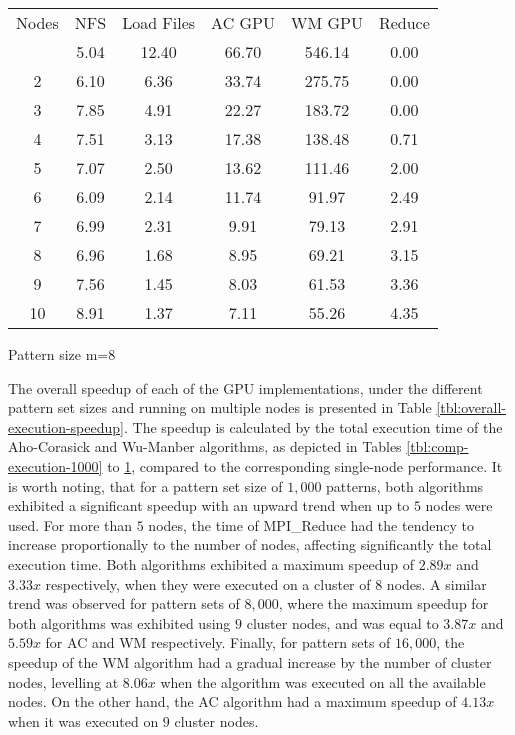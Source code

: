 \documentclass{ws-ijait}
\begin{document}
\begin{table}[h]
{\begin{tabular}{@{}c |ccccc@{}} \toprule
Nodes & NFS & Load Files & AC GPU & WM GPU & Reduce\\
\colrule
1 & 5.04 & 12.40 & 66.70 & 546.14 & 0.00\\
2 & 6.10 & 6.36 & 33.74 & 275.75 & 0.00\\
3 & 7.85 & 4.91 & 22.27 & 183.72 & 0.00\\
4 & 7.51 & 3.13 & 17.38 & 138.48 & 0.71\\
5 & 7.07 & 2.50 & 13.62 & 111.46 & 2.00\\
6 & 6.09 & 2.14 & 11.74 & 91.97 & 2.49\\
7 & 6.99 & 2.31 & 9.91 & 79.13 & 2.91\\
8 & 6.96 & 1.68 & 8.95 & 69.21 & 3.15\\
9 & 7.56 & 1.45 & 8.03 & 61.53 & 3.36\\
10 & 8.91 & 1.37 & 7.11 & 55.26 & 4.35\\
\hline
\end{tabular}}
\begin{tabnote}
Pattern size m=$8$
\end{tabnote}
\label{tbl:comp-execution-16000}
\end{table}

The overall speedup of each of the GPU implementations, under the different pattern set sizes and running on multiple nodes is presented in Table \ref{tbl:overall-execution-speedup}. The speedup is calculated by the total execution time of the Aho-Corasick and Wu-Manber algorithms, as depicted in Tables \ref{tbl:comp-execution-1000} to \ref{tbl:comp-execution-16000}, compared to the corresponding single-node performance. It is worth noting, that for a pattern set size of $1,000$ patterns, both algorithms exhibited a significant speedup with an upward trend when up to $5$ nodes were used. For more than $5$ nodes, the time of MPI\_Reduce had the tendency to increase proportionally to the number of nodes, affecting significantly the total execution time. Both algorithms exhibited a maximum speedup of $2.89x$ and $3.33x$ respectively, when they were executed on a cluster of $8$ nodes. A similar trend was observed for pattern sets of $8,000$, where the maximum speedup for both algorithms was exhibited using $9$ cluster nodes, and was equal to $3.87x$ and $5.59x$ for AC and WM respectively. Finally, for pattern sets of $16,000$, the speedup of the WM algorithm had a gradual increase by the number of cluster nodes, levelling at $8.06x$ when the algorithm was executed on all the available nodes. On the other hand, the AC algorithm had a maximum speedup of $4.13x$ when it was executed on $9$ cluster nodes.
\end{document}
